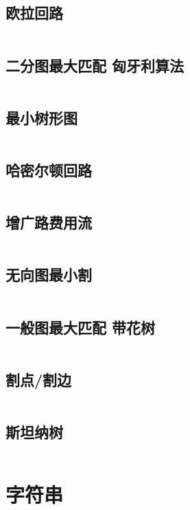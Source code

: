 \documentclass[titlepage,landscape,a4paper,10pt]{article}
\begin{document}
\begin{multicols}{2}
\begin{spacing}{0.8}
\subsection{欧拉回路}
\inputminted{cpp}{Graph/欧拉回路.cpp}

\subsection{二分图最大匹配 匈牙利算法}
\inputminted{cpp}{Graph/匈牙利算法.cpp}

\subsection{最小树形图}
\inputminted{cpp}{Graph/朱刘.cpp}

\subsection{哈密尔顿回路}
\inputminted{cpp}{Graph/哈密尔顿回路.cpp}

\subsection{增广路费用流}
\inputminted{cpp}{Graph/增广路费用流.cpp}

\subsection{无向图最小割}
\inputminted{cpp}{Graph/无向图最小割.cpp}

\subsection{一般图最大匹配 带花树}
\inputminted{cpp}{Graph/带花树.cpp}


\subsection{割点/割边}
\inputminted{cpp}{Graph/tarjan.cpp}

\subsection{斯坦纳树}
\inputminted{cpp}{Graph/斯坦纳树.cpp}

\section{字符串}


\end{spacing}
\end{multicols}
\end{document}
